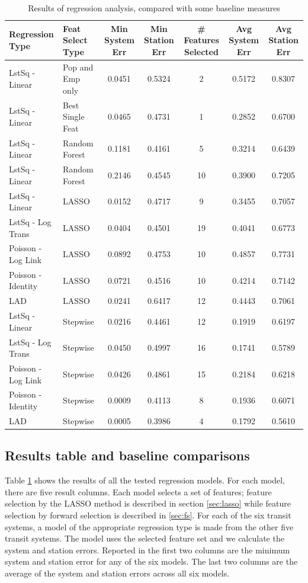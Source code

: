 \documentclass[11pt]{article}
\begin{document}
\begin{table}[H]
\begingroup\fontsize{8}{15}\selectfont
\centering
\begin{tabular}{ll|ccccc}
\toprule
Regression Type&Feat Select Type& Min System Err&Min Station Err& \# Features Selected& Avg System Err& Avg Station Err\\
\midrule
LstSq - Linear&Pop and Emp only&0.0451&0.5324&2&0.5172&0.8307\\
LstSq - Linear&Best Single Feat&0.0465&0.4731&1&0.2852&0.6700\\
LstSq - Linear&Random Forest&0.1181&0.4161&5&0.3214&0.6439\\
LstSq - Linear&Random Forest&0.2146&0.4545&10&0.3900&0.7205\\
\midrule
LstSq - Linear&LASSO&0.0152&0.4717&9&0.3455&0.7057\\
LstSq - Log Trans&LASSO&0.0404&0.4501&19&0.4041&0.6773\\
Poisson - Log Link&LASSO&0.0892&0.4753&10&0.4857&0.7731\\
Poisson - Identity&LASSO&0.0721&0.4516&10&0.4214&0.7142\\
LAD&LASSO&0.0241&0.6417&12&0.4443&0.7061\\
\midrule
LstSq - Linear&Stepwise&0.0216&0.4461&12&0.1919&0.6197\\
LstSq - Log Trans&Stepwise&0.0450&0.4997&16&0.1741&0.5789\\
Poisson - Log Link&Stepwise&0.0426&0.4861&15&0.2184&0.6218\\
Poisson - Identity&Stepwise&0.0009&0.4113&8&0.1936&0.6071\\
LAD&Stepwise&0.0005&0.3986&4&0.1792&0.5610\\
\end{tabular}
\caption{Results of regression analysis, compared with some baseline measures}\label{tab:rresults}
\endgroup
\end{table}

\subsection{Results table and baseline comparisons}

Table \ref{tab:rresults} shows the results of all the tested regression models. For each model, there are five result columns. Each model selects a set of features; feature selection by the LASSO method is described in section \ref{sec:lasso} while feature selection by forward selection is described in \ref{sec:fs}. For each of the six transit systems, a model of the appropriate regression type is made from the other five transit systems. The model uses the selected feature set and we calculate the system and station errors. Reported in the first two columns are the minimum system and station error for any of the six models. The last two columns are the average of the system and station errors across all six models. 
\end{document}
